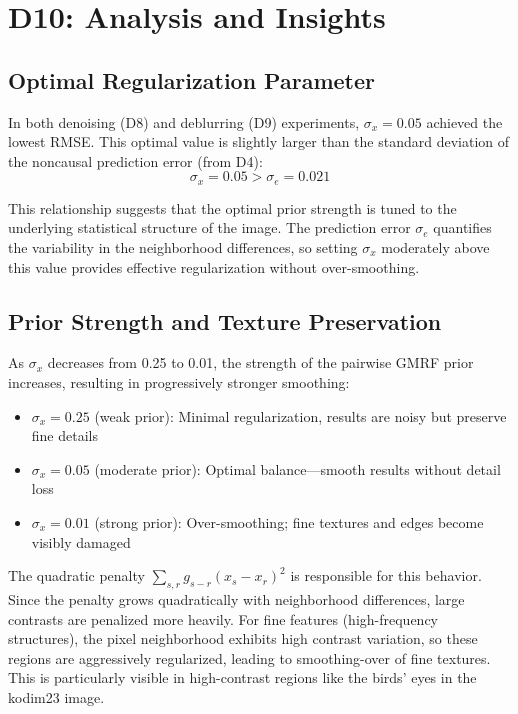 \documentclass[12pt]{article}
\begin{document}
\section*{D10: Analysis and Insights}

\subsection*{Optimal Regularization Parameter}

In both denoising (D8) and deblurring (D9) experiments, $\sigma_x = 0.05$ achieved the lowest RMSE. This optimal value is slightly larger than the standard deviation of the noncausal prediction error (from D4):
\begin{equation*}
\sigma_x = 0.05 > \sigma_e = 0.021
\end{equation*}

This relationship suggests that the optimal prior strength is tuned to the underlying statistical structure of the image. The prediction error $\sigma_e$ quantifies the variability in the neighborhood differences, so setting $\sigma_x$ moderately above this value provides effective regularization without over-smoothing.

\subsection*{Prior Strength and Texture Preservation}

As $\sigma_x$ decreases from 0.25 to 0.01, the strength of the pairwise GMRF prior increases, resulting in progressively stronger smoothing:

\begin{itemize}
\item $\sigma_x = 0.25$ (weak prior): Minimal regularization, results are noisy but preserve fine details
\item $\sigma_x = 0.05$ (moderate prior): Optimal balance—smooth results without detail loss
\item $\sigma_x = 0.01$ (strong prior): Over-smoothing; fine textures and edges become visibly damaged
\end{itemize}

The quadratic penalty $\sum_{s,r} g_{s-r}(x_s - x_r)^2$ is responsible for this behavior. Since the penalty grows quadratically with neighborhood differences, large contrasts are penalized more heavily. For fine features (high-frequency structures), the pixel neighborhood exhibits high contrast variation, so these regions are aggressively regularized, leading to smoothing-over of fine textures. This is particularly visible in high-contrast regions like the birds' eyes in the kodim23 image.
\end{document}
